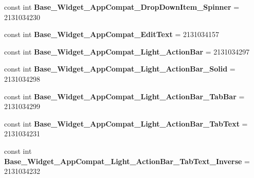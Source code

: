 \begin{DoxyCompactItemize}
\item 
\hypertarget{classClient_1_1Droid_1_1Resource_1_1Style_aba58f0cf68aa20dd55a8e51a00e60138}{}const int {\bfseries Base\+\_\+\+Widget\+\_\+\+App\+Compat\+\_\+\+Drop\+Down\+Item\+\_\+\+Spinner} = 2131034230\label{classClient_1_1Droid_1_1Resource_1_1Style_aba58f0cf68aa20dd55a8e51a00e60138}

\item 
\hypertarget{classClient_1_1Droid_1_1Resource_1_1Style_ad00eedc6e54558d12e4655b8ccbf155f}{}const int {\bfseries Base\+\_\+\+Widget\+\_\+\+App\+Compat\+\_\+\+Edit\+Text} = 2131034157\label{classClient_1_1Droid_1_1Resource_1_1Style_ad00eedc6e54558d12e4655b8ccbf155f}

\item 
\hypertarget{classClient_1_1Droid_1_1Resource_1_1Style_a3c1648a1e8bf94383da5779dd5592ce4}{}const int {\bfseries Base\+\_\+\+Widget\+\_\+\+App\+Compat\+\_\+\+Light\+\_\+\+Action\+Bar} = 2131034297\label{classClient_1_1Droid_1_1Resource_1_1Style_a3c1648a1e8bf94383da5779dd5592ce4}

\item 
\hypertarget{classClient_1_1Droid_1_1Resource_1_1Style_a27ddfabb0a853baea1dd87f142ffb946}{}const int {\bfseries Base\+\_\+\+Widget\+\_\+\+App\+Compat\+\_\+\+Light\+\_\+\+Action\+Bar\+\_\+\+Solid} = 2131034298\label{classClient_1_1Droid_1_1Resource_1_1Style_a27ddfabb0a853baea1dd87f142ffb946}

\item 
\hypertarget{classClient_1_1Droid_1_1Resource_1_1Style_a3ece657cf4e0c2baa1823f6dc2d93ba7}{}const int {\bfseries Base\+\_\+\+Widget\+\_\+\+App\+Compat\+\_\+\+Light\+\_\+\+Action\+Bar\+\_\+\+Tab\+Bar} = 2131034299\label{classClient_1_1Droid_1_1Resource_1_1Style_a3ece657cf4e0c2baa1823f6dc2d93ba7}

\item 
\hypertarget{classClient_1_1Droid_1_1Resource_1_1Style_a6cb3914fa831c0bb42626c478d764343}{}const int {\bfseries Base\+\_\+\+Widget\+\_\+\+App\+Compat\+\_\+\+Light\+\_\+\+Action\+Bar\+\_\+\+Tab\+Text} = 2131034231\label{classClient_1_1Droid_1_1Resource_1_1Style_a6cb3914fa831c0bb42626c478d764343}

\item 
\hypertarget{classClient_1_1Droid_1_1Resource_1_1Style_a80fe1ea2913cc33b3d145ad987c75546}{}const int {\bfseries Base\+\_\+\+Widget\+\_\+\+App\+Compat\+\_\+\+Light\+\_\+\+Action\+Bar\+\_\+\+Tab\+Text\+\_\+\+Inverse} = 2131034232\label{classClient_1_1Droid_1_1Resource_1_1Style_a80fe1ea2913cc33b3d145ad987c75546}


\end{DoxyCompactItemize}
